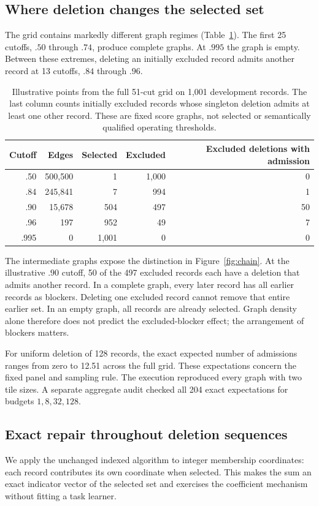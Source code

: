 \subsection{Where deletion changes the selected set}
The grid contains markedly different graph regimes
(Table~\ref{tab:structure}). The first 25 cutoffs, $.50$ through $.74$,
produce complete graphs. At $.995$ the graph is empty. Between these
extremes, deleting an initially excluded record admits another record at
13 cutoffs, $.84$ through $.96$.

\begin{table}[t]
\centering
\small
\caption{Illustrative points from the full 51-cut grid on 1,001 development
records. The last column counts initially excluded records whose singleton
deletion admits at least one other record. These are fixed score graphs,
not selected or semantically qualified operating thresholds.}
\label{tab:structure}
\begin{tabular}{rrrrr}
\hline
Cutoff & Edges & Selected & Excluded & Excluded deletions with admission\\
\hline
.50 & 500,500 & 1 & 1,000 & 0\\
.84 & 245,841 & 7 & 994 & 1\\
.90 & 15,678 & 504 & 497 & 50\\
.96 & 197 & 952 & 49 & 7\\
.995 & 0 & 1,001 & 0 & 0\\
\hline
\end{tabular}
\end{table}

The intermediate graphs expose the distinction in Figure~\ref{fig:chain}.
At the illustrative $.90$ cutoff, 50 of the 497 excluded records each
have a deletion that admits another record. In a complete graph, every
later record has all earlier records as blockers. Deleting one excluded
record cannot remove that entire earlier set. In an empty graph, all
records are already selected. Graph density alone therefore does not
predict the excluded-blocker effect; the arrangement of blockers matters.

For uniform deletion of 128 records, the exact expected number of
admissions ranges from zero to 12.51 across the full grid. These
expectations concern the fixed panel and sampling rule. The execution
reproduced every graph with two tile sizes. A separate aggregate audit
checked all 204 exact expectations for budgets $1,8,32,128$.

\subsection{Exact repair throughout deletion sequences}
We apply the unchanged indexed algorithm to integer membership coordinates:
each record contributes its own coordinate when selected. This makes the
sum an exact indicator vector of the selected set and exercises the
coefficient mechanism without fitting a task learner.

